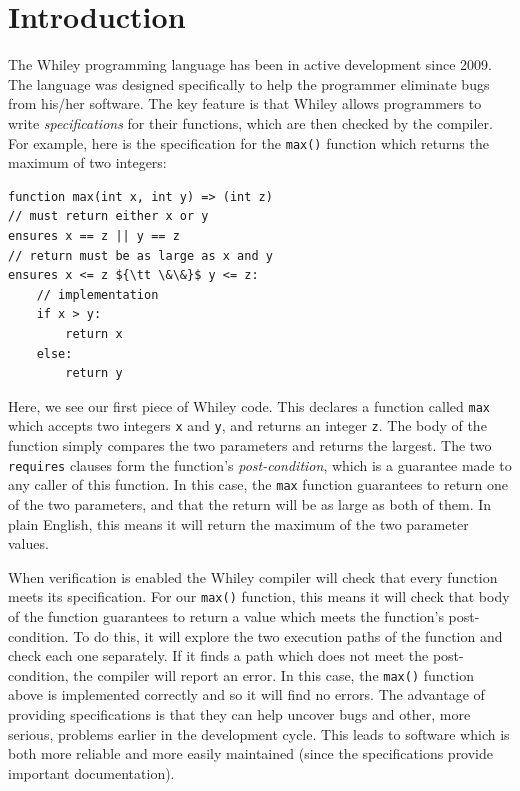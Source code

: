 \section{Introduction}
The Whiley programming language has been in active development since
2009.  The language was designed specifically to help the programmer
eliminate bugs from his/her software.  The key feature is that Whiley
allows programmers to write {\em specifications} for their functions,
which are then checked by the compiler.  For example, here is the
specification for the \lstinline{max()} function which returns the
maximum of two integers:

\begin{lstlisting}
function max(int x, int y) => (int z)
// must return either x or y
ensures x == z || y == z
// return must be as large as x and y
ensures x <= z ${\tt \&\&}$ y <= z:
    // implementation
    if x > y:
        return x
    else:
        return y
\end{lstlisting}

Here, we see our first piece of Whiley code.  This declares a function
called \lstinline{max} which accepts two integers \lstinline{x} and
\lstinline{y}, and returns an integer \lstinline{z}.  The body of the
function simply compares the two parameters and returns the largest.
The two \lstinline{requires} clauses form the function's {\em
  post-condition}, which is a guarantee made to any caller of this
function.  In this case, the \lstinline{max} function guarantees to
return one of the two parameters, and that the return will be as large
as both of them.  In plain English, this means it will return the
maximum of the two parameter values.

When verification is enabled the Whiley compiler will check that every
function meets its specification.  For our \lstinline{max()} function,
this means it will check that body of the function guarantees to
return a value which meets the function's post-condition.  To do this,
it will explore the two execution paths of the function and check each
one separately.  If it finds a path which does not meet the
post-condition, the compiler will report an error.  In this case, the
\lstinline{max()} function above is implemented correctly and so it
will find no errors.  The advantage of providing specifications is
that they can help uncover bugs and other, more serious, problems
earlier in the development cycle.  This leads to software which is
both more reliable and more easily maintained (since the
specifications provide important documentation).

